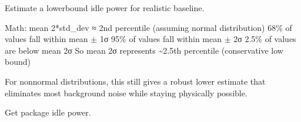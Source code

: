 \documentclass[letterpaper,10pt,english]{sphinxmanual}
\begin{document}
\begin{fulllineitems}
\begin{fulllineitems}
\end{fulllineitems}


\begin{fulllineitems}
\label{\detokenize{core.models.baseline_measurement:core.models.baseline_measurement.BaselineMeasurement.min_power_watts}}
\pysigstartsignatures
\pysigline
{}
\pysigstopsignatures
\sphinxAtStartPar
Estimate a lower\sphinxhyphen{}bound idle power for realistic baseline.

\sphinxAtStartPar
Math: mean \sphinxhyphen{} 2*std\_dev ≈ 2nd percentile (assuming normal distribution)
\sphinxhyphen{} 68\% of values fall within mean \(\pm\) 1σ
\sphinxhyphen{} 95\% of values fall within mean \(\pm\) 2σ
\sphinxhyphen{} 2.5\% of values are below mean \sphinxhyphen{} 2σ
\sphinxhyphen{} So mean \sphinxhyphen{} 2σ represents \textasciitilde{}2.5th percentile (conservative low bound)

\sphinxAtStartPar
For non\sphinxhyphen{}normal distributions, this still gives a robust lower estimate
that eliminates most background noise while staying physically possible.

\end{fulllineitems}


\begin{fulllineitems}
\label{\detokenize{core.models.baseline_measurement:core.models.baseline_measurement.BaselineMeasurement.package_power_w}}
\pysigstartsignatures
\pysigline
{}
\pysigstopsignatures
\sphinxAtStartPar
Get package idle power.

\end{fulllineitems}



\end{fulllineitems}
\end{document}

